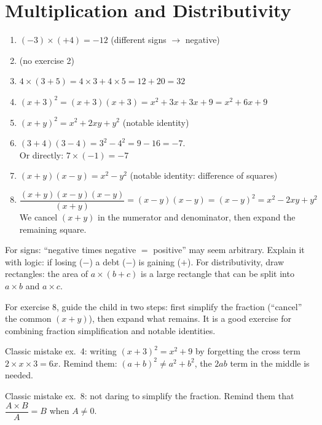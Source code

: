 \documentclass[11pt,a4paper]{article}
\newcommand{\corrbox}[1]{
\begin{tcolorbox}[colback=correctgreen!8!white,colframe=correctgreen!60!black]
#1
\end{tcolorbox}
}
\newcommand{\tipbox}[1]{
\begin{tcolorbox}[colback=tipblue!8!white,colframe=tipblue!60!black,title=\textbf{How to explain}]
#1
\end{tcolorbox}
}
\newcommand{\warnbox}[1]{
\begin{tcolorbox}[colback=warnred!8!white,colframe=warnred!60!black,title=\textbf{Common mistakes}]
#1
\end{tcolorbox}
}
\begin{document}
\section{Multiplication and Distributivity}

\corrbox{
\begin{enumerate}
\item $(-3) \times (+4) = -12$ \quad (different signs $\rightarrow$ negative)
\item (no exercise 2)
\item $4 \times (3 + 5) = 4 \times 3 + 4 \times 5 = 12 + 20 = 32$
\item $(x + 3)^{2} = (x+3)(x+3) = x^{2} + 3x + 3x + 9 = x^{2} + 6x + 9$
\item $(x + y)^{2} = x^{2} + 2xy + y^{2}$ \quad (notable identity)
\item $(3 + 4)(3 - 4) = 3^{2} - 4^{2} = 9 - 16 = -7$. \\ Or directly: $7 \times (-1) = -7$
\item $(x + y)(x - y) = x^{2} - y^{2}$ \quad (notable identity: difference of squares)
\item $\dfrac{(x + y)(x - y)(x - y)}{(x + y)} = (x-y)(x-y) = (x-y)^{2} = x^{2} - 2xy + y^{2}$\\[0.2cm]
We cancel $(x+y)$ in the numerator and denominator, then expand the remaining square.
\end{enumerate}
}

\tipbox{
For signs: ``negative times negative $=$ positive'' may seem arbitrary. Explain it with logic: if losing ($-$) a debt ($-$) is gaining ($+$). For distributivity, draw rectangles: the area of $a \times (b + c)$ is a large rectangle that can be split into $a \times b$ and $a \times c$.

\vspace{0.2cm}
For exercise 8, guide the child in two steps: first simplify the fraction (``cancel'' the common $(x+y)$), then expand what remains. It is a good exercise for combining fraction simplification and notable identities.
}

\warnbox{
Classic mistake ex.~4: writing $(x + 3)^{2} = x^{2} + 9$ by forgetting the cross term $2 \times x \times 3 = 6x$. Remind them: $(a+b)^{2} \neq a^{2} + b^{2}$, the $2ab$ term in the middle is needed.

\vspace{0.2cm}
Classic mistake ex.~8: not daring to simplify the fraction. Remind them that $\dfrac{A \times B}{A} = B$ when $A \neq 0$.
}
\end{document}
